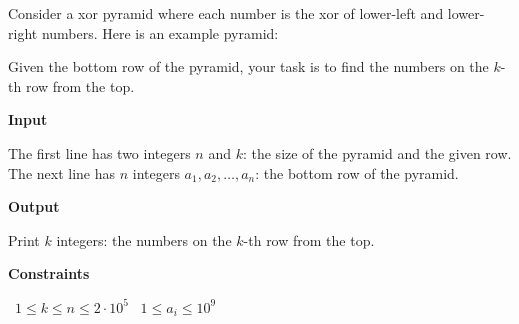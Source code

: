 Consider a xor pyramid where each number is the xor of lower-left and lower-right numbers. Here is an example pyramid:

Given the bottom row of the pyramid, your task is to find the numbers on the $k$-th row from the top.

\vspace{0.3cm}\noindent\textbf{Input}

The first line has two integers $n$ and $k$: the size of the pyramid and the given row.
The next line has $n$ integers $a_1,a_2,\dots,a_n$: the bottom row of the pyramid.

\vspace{0.3cm}\noindent\textbf{Output}

Print $k$ integers: the numbers on the $k$-th row from the top.

\vspace{0.3cm}\noindent\textbf{Constraints}

\textbullet\ $1 \le k \le n \le 2 \cdot 10^5$
\textbullet\ $1 \le a_i \le 10^9$